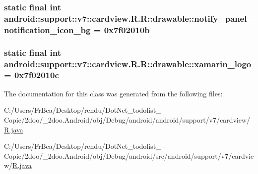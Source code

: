 \hypertarget{classandroid_1_1support_1_1v7_1_1cardview_1_1_r_1_1drawable_17ffef0e9aa6633055aa1c972d688e71}{
\subsubsection[{notify\_\-panel\_\-notification\_\-icon\_\-bg}]{\setlength{\rightskip}{0pt plus 5cm}static final int android::support::v7::cardview.R.R::drawable::notify\_\-panel\_\-notification\_\-icon\_\-bg = 0x7f02010b}}
\label{classandroid_1_1support_1_1v7_1_1cardview_1_1_r_1_1drawable_17ffef0e9aa6633055aa1c972d688e71}


\hypertarget{classandroid_1_1support_1_1v7_1_1cardview_1_1_r_1_1drawable_2f1a73543f1cc736fa86d4af7ded11fa}{
\subsubsection[{xamarin\_\-logo}]{\setlength{\rightskip}{0pt plus 5cm}static final int android::support::v7::cardview.R.R::drawable::xamarin\_\-logo = 0x7f02010c}}
\label{classandroid_1_1support_1_1v7_1_1cardview_1_1_r_1_1drawable_2f1a73543f1cc736fa86d4af7ded11fa}




The documentation for this class was generated from the following files:\begin{CompactItemize}
\item 
C:/Users/FrBea/Desktop/rendu/DotNet\_\-todolist\_ - Copie/2doo/\_\-2doo.Android/obj/Debug/android/android/support/v7/cardview/\hyperlink{android_2support_2v7_2cardview_2_r_8java}{R.java}\item 
C:/Users/FrBea/Desktop/rendu/DotNet\_\-todolist\_ - Copie/2doo/\_\-2doo.Android/obj/Debug/android/src/android/support/v7/cardview/\hyperlink{src_2android_2support_2v7_2cardview_2_r_8java}{R.java}\end{CompactItemize}
